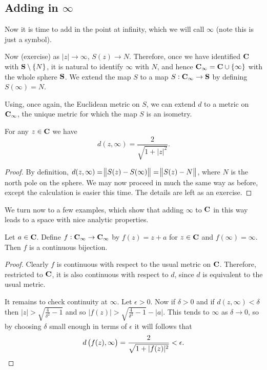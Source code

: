 \subsection{Adding in $\infty$}
Now it is time to add in the point at infinity, which we will call $\infty$ (note this is just a symbol).

Now (exercise) as $|z|\to\infty$, $S(z)\to N$. Therefore, once we have identified $\mathbf C$ with $\mathbf S\setminus\{N\}$, it is natural to identify $\infty$ with $N$, and hence $\mathbf C_\infty=\mathbf C\cup\{\infty\}$ with the whole sphere $\mathbf S$. We extend the map $S$ to a map $S:\mathbf C_\infty\to\mathbf S$ by defining $S(\infty)=N$.

Using, once again, the Euclidean metric on $S$, we can extend $d$ to a metric on $\mathbf C_\infty$, the unique metric for which the map $S$ is an isometry.

\begin{lemma}
For any $z\in\mathbf C$ we have
\[d(z,\infty)=\frac{2}{\sqrt{1+|z|^2}}.\]
\end{lemma}

\begin{proof}
By definition, $d(z,\infty)=\norm{S(z)-S(\infty)}=\norm{S(z)-N}$, where $N$ is the north pole on the sphere. We may now proceed in much the same way as before, except the calculation is easier this time. The details are left as an exercise.
\end{proof}

We turn now to a few examples, which show that adding $\infty$ to $\mathbf C$ in this way leads to a space with nice analytic properties.

\begin{example}[Translations]
Let $a\in\mathbf C$. Define $f:\mathbf C_\infty\to\mathbf C_\infty$ by $f(z)=z+a$ for $z\in\mathbf C$ and $f(\infty)=\infty$. Then $f$ is a continuous bijection.
\end{example}

\begin{proof}
Clearly $f$ is continuous with respect to the usual metric on $\mathbf C$. Therefore, restricted to $\mathbf C$, it is also continuous with respect to $d$, since $d$ is equivalent to the usual metric.

It remains to check continuity at $\infty$. Let $\epsilon>0$. Now if $\delta>0$ and if $d(z,\infty)<\delta$ then $|z|>\sqrt{\frac{4}{\delta^2}-1}$ and so $|f(z)|>\sqrt{\frac{4}{\delta^2}-1}-|a|$. This tends to $\infty$ as $\delta\to0$, so by choosing $\delta$ small enough in terms of $\epsilon$ it will follows that
\[d\left(f(z),\infty\right)=\frac{2}{\sqrt{1+|f(z)|^2}}<\epsilon.\]
\end{proof}

